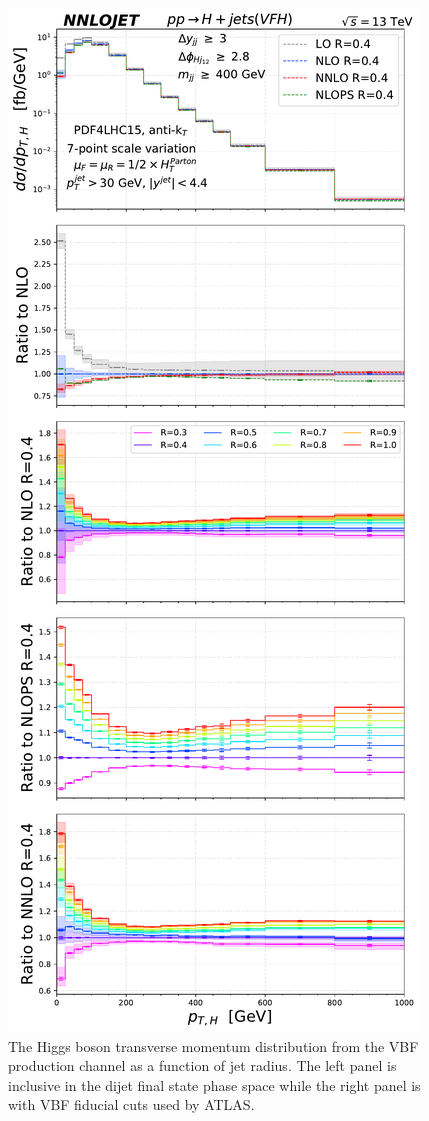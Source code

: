\documentclass[10pt,prd,fleqn,superscriptaddress,notitlepage,nofootinbib,preprintnumbers,nobalancelastpage]{revtex4-1}
\newcommand{\VBF}{VBF\xspace}
\begin{document}
\begin{figure}[p]
\includegraphics[scale=0.44]{figures/rdep/LH19VFH_pth_largebin_ATLAS.pdf}
\caption{The Higgs boson transverse momentum distribution from the \VBF production channel as a function of jet radius. The left panel is inclusive in the dijet final state phase space while the right panel is with VBF fiducial cuts used by ATLAS.}
\label{fig:fig_Higgs_pT_NNLO_incandATLAS}
\end{figure}
\end{document}
